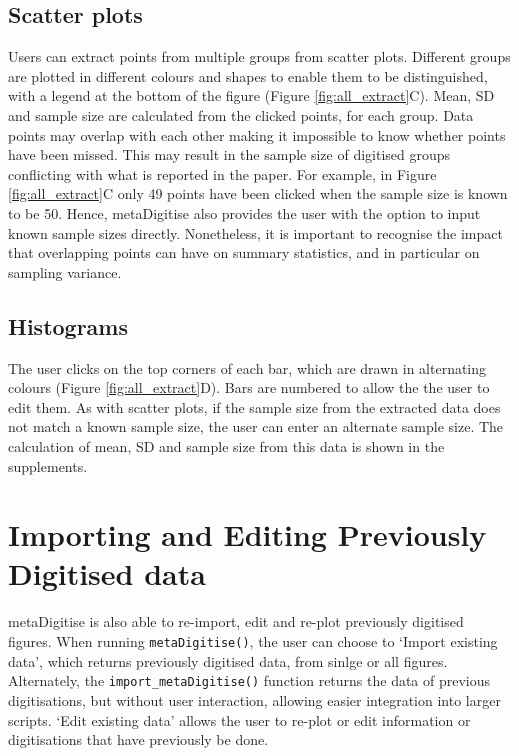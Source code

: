 \documentclass[12pt]{article}
\newcommand{\fct}[1]{\texttt{#1()}}
\newcommand{\pkg}[1]{{\fontseries{b}\selectfont #1}}
\begin{document}
\subsection{Scatter plots}
Users can extract points from multiple groups from scatter plots. Different groups are plotted in different colours and shapes to enable them to be distinguished, with a legend at the bottom of the figure (Figure \ref{fig:all_extract}C). Mean, SD and sample size are calculated from the clicked points, for each group. Data points may overlap with each other making it impossible to know whether points have been missed. This may result in the sample size of digitised groups conflicting with what is reported in the paper. For example, in Figure \ref{fig:all_extract}C only 49 points have been clicked when the sample size is known to be 50. Hence, \pkg{metaDigitise} also provides the user with the option to input known sample sizes directly. Nonetheless, it is important to recognise the impact that overlapping points can have on summary statistics, and in particular on sampling variance.

\subsection{Histograms}
The user clicks on the top corners of each bar, which are drawn in alternating colours (Figure \ref{fig:all_extract}D). Bars are numbered to allow the the user to edit them. As with scatter plots, if the sample size from the extracted data does not match a known sample size, the user can enter an alternate sample size. The calculation of mean, SD and sample size from this data is shown in the supplements.




\section{Importing and Editing Previously Digitised data}
\pkg{metaDigitise} is also able to re-import, edit and re-plot previously digitised figures. When running \fct{metaDigitise}, the user can choose to `Import existing data', which returns previously digitised data, from sinlge or all figures. Alternately, the \fct{import\_metaDigitise} function returns the data of previous digitisations, but without user interaction, allowing easier integration into larger scripts. `Edit existing data' allows the user to re-plot or edit information or digitisations that have previously be done.
\end{document}
